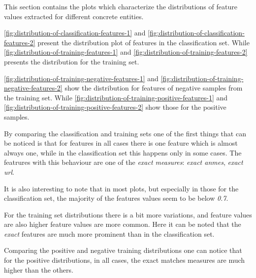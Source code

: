 \documentclass[epsfig,a4paper,11pt,titlepage,twoside,openany]{book}
\begin{document}
This section contains the plots which characterize the distributions of feature values extracted for different concrete entities. 

\autoref{fig:distribution-of-classification-features-1} and \autoref{fig:distribution-of-classification-features-2} present the distribution plot of features in the classification set. While \autoref{fig:distribution-of-training-features-1} and \autoref{fig:distribution-of-training-features-2} presents the distribution for the training set.

\autoref{fig:distribution-of-training-negative-features-1} and \autoref{fig:distribution-of-training-negative-features-2} show the distribution for features of negative samples from the training set. While \autoref{fig:distribution-of-training-positive-features-1} and \autoref{fig:distribution-of-training-positive-features-2} show those for the positive samples.

By comparing the classification and training sets one of the first things that can be noticed is that for features in all cases there is one feature which is almost always one, while in the classification set this happens only in some cases. The featrures with this behaviour are one of the \textit{exact measures}: \textit{exact anmes}, \textit{exact url}.

It is also interesting to note that in most plots, but especially in those for the classification set, the majority of the features values seem to be below \textit{0.7}.

For the training set distributions there is a bit more variations, and feature values are also higher feature values are more common. Here it can be noted that the \textit{exact} features are much more prominent than in the classification set. 

Comparing the positive and negative training distributions one can notice that for the positive distributions, in all cases, the exact matches measures are much higher than the others.

\end{document}
